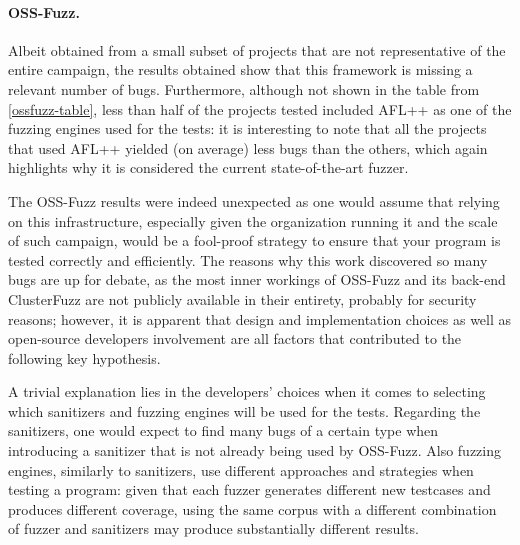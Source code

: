 \paragraph{OSS-Fuzz.} Albeit obtained from a small subset of projects that are not representative of the entire campaign, the results obtained show that this framework is missing a relevant number of bugs. Furthermore, although not shown in the table from \ref{ossfuzz-table}, less than half of the projects tested included AFL++ as one of the fuzzing engines used for the tests: it is interesting to note that all the projects that used AFL++ yielded (on average) less bugs than the others, which again highlights why it is considered the current state-of-the-art fuzzer.

The OSS-Fuzz results were indeed unexpected as one would assume that relying on this infrastructure, especially given the organization running it and the scale of such campaign, would be a fool-proof strategy to ensure that your program is tested correctly and efficiently. The reasons why this work discovered so many bugs are up for debate, as the most inner workings of OSS-Fuzz and its back-end ClusterFuzz are not publicly available in their entirety, probably for security reasons; however, it is apparent that design and implementation choices as well as open-source developers involvement are all factors that contributed to the following key hypothesis.

A trivial explanation lies in the developers' choices when it comes to selecting which sanitizers and fuzzing engines will be used for the tests. Regarding the sanitizers, one would expect to find many bugs of a certain type when introducing a sanitizer that is not already being used by OSS-Fuzz. Also fuzzing engines, similarly to sanitizers, use different approaches and strategies when testing a program: given that each fuzzer generates different new testcases and produces different coverage, using the same corpus with a different combination of fuzzer and sanitizers may produce substantially different results. 

